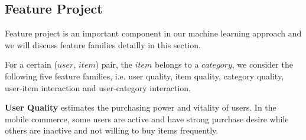 \documentclass{llncs}
\begin{document}
\subsection{Feature Project}
Feature project is an important component in our machine learning approach
and we will discuss feature families detailly in this section.

For a certain ($user$, $item$) pair, the $item$ belongs to a $category$,
we consider the following five feature families,
i.e. user quality, item quality, category quality, user-item interaction
and user-category interaction.

\textbf{User Quality} estimates the purchasing power and vitality of users.
In the mobile commerce, some users are active and have strong purchase desire
while others are inactive and not willing to buy items frequently.
\end{document}

